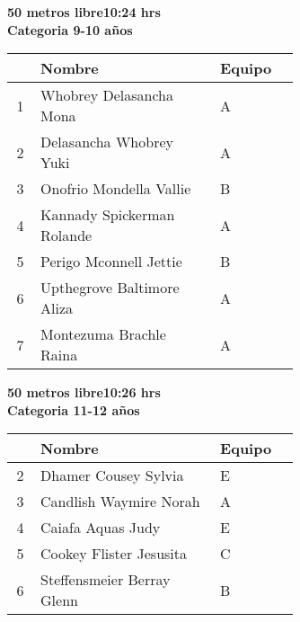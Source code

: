 \begin{minipage}{0.95\linewidth}\vspace{0.5cm} 
\begin{flushleft}
\textbf{
\hspace{-0.15cm}50 metros libre\hspace{1.5cm}10:24 hrs \\Categoria 9-10 años}\vspace{-0.2cm} 
\end{flushleft}
\begin{tabular}{cp{0.63\linewidth}l}
\hline
& \textbf{Nombre} & \textbf{Equipo} \\ \hline
1 & Whobrey Delasancha Mona & A \\ 
2 & Delasancha Whobrey Yuki & A \\ 
3 & Onofrio Mondella Vallie & B \\ 
4 & Kannady Spickerman Rolande & A \\ 
5 & Perigo Mconnell Jettie & B \\ 
6 & Upthegrove Baltimore Aliza & A \\ 
7 & Montezuma Brachle Raina & A \\ 
\end{tabular}
\end{minipage}
\begin{minipage}{0.95\linewidth}\vspace{0.5cm} 
\begin{flushleft}
\textbf{
\hspace{-0.15cm}50 metros libre\hspace{1.5cm}10:26 hrs \\Categoria 11-12 años}\vspace{-0.2cm} 
\end{flushleft}
\begin{tabular}{cp{0.63\linewidth}l}
\hline
& \textbf{Nombre} & \textbf{Equipo} \\ \hline
2 & Dhamer Cousey Sylvia & E \\ 
3 & Candlish Waymire Norah & A \\ 
4 & Caiafa Aquas Judy & E \\ 
5 & Cookey Flister Jesusita & C \\ 
6 & Steffensmeier Berray Glenn & B \\ 
\end{tabular}
\end{minipage}
